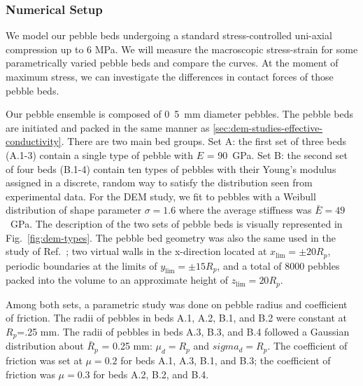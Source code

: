 \subsubsection{Numerical Setup}
We model our pebble beds undergoing a standard stress-controlled uni-axial compression up to 6 MPa. We will measure the macroscopic stress-strain for some parametrically varied pebble beds and compare the curves. At the moment of maximum stress, we can investigate the differences in contact forces of those pebble beds.

Our pebble ensemble is composed of \si{0.5 mm} diameter \lis pebbles. The pebble beds are initiated and packed in the same manner as \cref{sec:dem-studies-effective-conductivity}. There are two main bed groups. Set A: the first set of three beds (A.1-3) contain a single type of pebble with $E$ = \si{90 GPa}. Set B: the second set of four beds (B.1-4) contain ten types of pebbles with their Young's modulus assigned in a discrete, random way to satisfy the distribution seen from experimental data. For the DEM study, we fit to \lis pebbles with a Weibull distribution of shape parameter $\sigma = 1.6$ where the average stiffness was $\bar{E} = 49$~GPa. The description of the two sets of pebble beds is visually represented in Fig.~\ref{fig:dem-types}. The pebble bed geometry was also the same used in the study of Ref.~\cite{VanLew2014}; two virtual walls in the x-direction located at $x_\text{lim} = \pm 20 R_p$, periodic boundaries at the limits of $y_\text{lim} = \pm 15 R_p$, and a total of 8000 pebbles packed into the volume to an approximate height of $z_\text{lim} = 20 R_p$.

Among both sets, a parametric study was done on pebble radius and coefficient of friction. The radii of pebbles in beds A.1, A.2, B.1, and B.2 were constant at $R_p$=.25 mm. The radii of pebbles in beds A.3, B.3, and B.4 followed a Gaussian distribution about $\bar{R}_p$ = 0.25 mm: $\mu_d = R_p$ and $sigma_d = R_p$. The coefficient of friction was set at $\mu = 0.2$ for beds A.1, A.3, B.1, and B.3; the coefficient of friction was $\mu = 0.3$ for beds A.2, B.2, and B.4.


